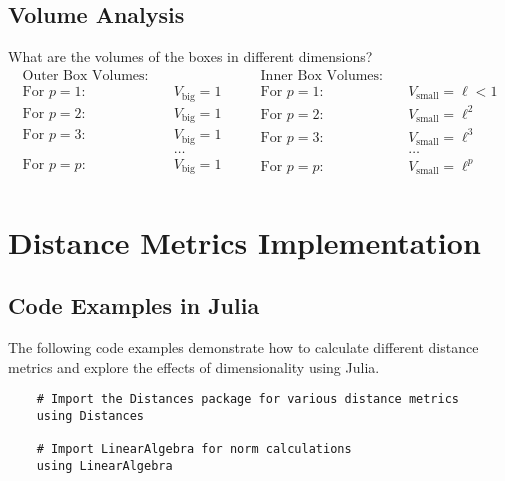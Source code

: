 \subsection{Volume Analysis}
What are the volumes of the boxes in different dimensions?
\[
    \begin{aligned}
        \text{Outer Box Volumes:} \quad\\
        \text{For } p=1: \quad & V_{\text{big}} = 1 \\
        \text{For } p=2: \quad & V_{\text{big}} = 1 \\
        \text{For } p=3: \quad & V_{\text{big}} = 1 \\
        & \dots \\
        \text{For } p=p: \quad & V_{\text{big}} = 1 \\
        \end{aligned}
        \quad \quad
        \begin{aligned}
        \text{Inner Box Volumes:} \quad\\
        \text{For } p=1: \quad & V_{\text{small}} = \ell < 1 \\
        \text{For } p=2: \quad & V_{\text{small}} = \ell^2 \\
        \text{For } p=3: \quad & V_{\text{small}} = \ell^3 \\
        & \dots \\
        \text{For } p=p: \quad & V_{\text{small}} = \ell^p \\
    \end{aligned}
\]

\section{Distance Metrics Implementation}
\subsection{Code Examples in Julia}
The following code examples demonstrate how to calculate different distance metrics and explore the effects of dimensionality using Julia.

\begin{tcolorbox}[width=\textwidth, left=-6mm, sharp corners, boxrule=0pt, title=\textbf{Import required packages}]
  \begin{verbatim}
    # Import the Distances package for various distance metrics
    using Distances

    # Import LinearAlgebra for norm calculations
    using LinearAlgebra 
  \end{verbatim}
\end{tcolorbox}

